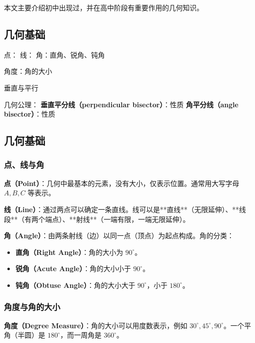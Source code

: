 
\begin{issues}
\issueDraft
\end{issues}

本文主要介绍初中出现过，并在高中阶段有重要作用的几何知识。

\subsection{几何基础}

点：
线：
角：直角、锐角、钝角

角度：角的大小

垂直与平行

几何公理：
\textbf{垂直平分线（perpendicular bisector）}：性质
\textbf{角平分线（angle bisector）}：性质


\subsection{几何基础}

\subsubsection{点、线与角}

\textbf{点（Point）}：几何中最基本的元素，没有大小，仅表示位置。通常用大写字母 $A, B, C$ 等表示。

\textbf{线（Line）}：通过两点可以确定一条直线。线可以是**直线**（无限延伸）、**线段**（有两个端点）、**射线**（一端有限，一端无限延伸）。

\textbf{角（Angle）}：由两条射线（边）以同一点（顶点）为起点构成。角的分类：
\begin{itemize}
    \item \textbf{直角（Right Angle）}：角的大小为 $90^\circ$。
    \item \textbf{锐角（Acute Angle）}：角的大小小于 $90^\circ$。
    \item \textbf{钝角（Obtuse Angle）}：角的大小大于 $90^\circ$，小于 $180^\circ$。
\end{itemize}

\subsubsection{角度与角的大小}

\textbf{角度（Degree Measure）}：角的大小可以用度数表示，例如 $30^\circ, 45^\circ, 90^\circ$。一个平角（半圆）是 $180^\circ$，而一周角是 $360^\circ$。

